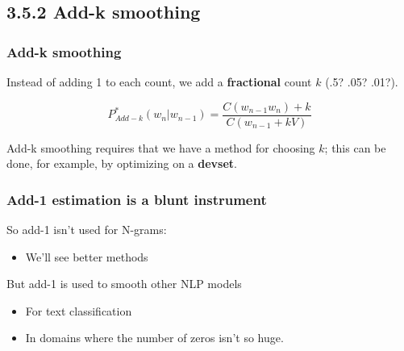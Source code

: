 \documentclass[13.5pt,aspecratio=169]{beamer}
\begin{document}
\subsection{3.5.2 Add-k smoothing}
\begin{frame}
    \onehalfspacing
        \frametitle{Add-k smoothing}
        {\Large Instead of adding 1 to each count, we add a \textbf{fractional} count $k$ (.5? .05? .01?). } \vspace{-2em}

        \begin{center} 
            \[ P^*_{Add-k} (w_n | w_{n-1}) = \frac{C(w_{n-1} w_n) + k}{C(w_{n-1} + kV)} \]
          \end{center}

       \begin{block}{}
        Add-k smoothing requires that we have a method for choosing $k$; this can be done, for example, by optimizing on a \textbf{devset}.

       \end{block}
    \end{frame}
    


\begin{frame}
\onehalfspacing
	\frametitle{Add-1 estimation is a blunt instrument}
    {\Large So add-1 isn’t used for N-grams:}
    \begin{itemize}
        \item {\large We’ll see better methods}

    \end{itemize}
    \vspace{3em}
    {\Large But add-1 is used to smooth other NLP models}
    \begin{itemize}
        \item {\large For text classification}
        \item {\large In domains where the number of zeros isn’t so huge.}
    \end{itemize}

   
\end{frame}

\end{document}
